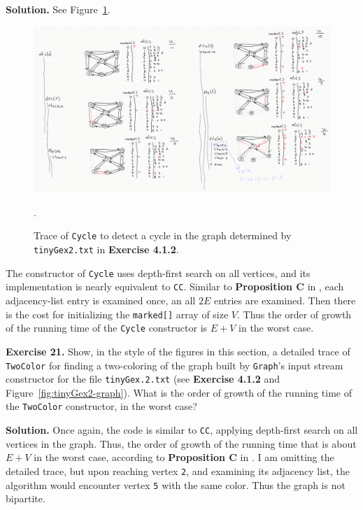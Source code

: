 \documentclass[12pt, a4paper]{article}
\newenvironment{ex}[2][Exercise]
{\par\medskip\noindent \textbf{#1 #2.}}
{\medskip}
\newenvironment{sol}[1][Solution]
{\par\medskip\noindent \textbf{#1.} }
{\medskip}
\begin{document}
	\begin{sol}
		See Figure~\ref{fig:ex-20}.
		\begin{figure}
			\centering
			\includegraphics[width=1.00\textwidth]{exercise-20.png}
			\caption{Trace of \texttt{Cycle} to detect a cycle in the graph determined by
				\texttt{tinyGex2.txt} in \textbf{Exercise 4.1.2}.}
			\label{fig:ex-20}.
		\end{figure}
		The constructor of \texttt{Cycle} uses depth-first search on all vertices,
		and its implementation is nearly equivalent to \texttt{CC}.
		Similar to \textbf{Proposition C} in \cite{sedgewick_wayne}, each adjacency-list
		entry is examined once, an all $2E$ entries are examined. Then there is the
		cost for initializing the \texttt{marked[]} array of size $V$. Thus the
		order of growth of the running time of the \texttt{Cycle} constructor is $E+V$
		in the worst case.
	\end{sol}
	\begin{ex}{21}
		Show, in the style of the figures in this section, a detailed trace of
		\texttt{TwoColor} for finding a two-coloring of the graph built by \texttt{Graph}'s
		input stream constructor for the file \texttt{tinyGex.2.txt} (see \textbf{Exercise 4.1.2}
		and Figure~\ref{fig:tinyGex2-graph}). What is the order of growth of the running
		time of the \texttt{TwoColor} constructor, in the worst case?
	\end{ex}
	\begin{sol}
		Once again, the code is similar to \texttt{CC}, applying depth-first search on
		all vertices in the graph. Thus, the order of growth of the running time
		that is about $E+V$ in the worst case, according to \textbf{Proposition C}
		in \cite{sedgewick_wayne}. I am omitting the detailed trace, but upon reaching
		vertex \texttt{2}, and examining its adjacency list, the algorithm would encounter
		vertex \texttt{5} with the same color. Thus the graph is not bipartite.
	\end{sol}
\end{document}
